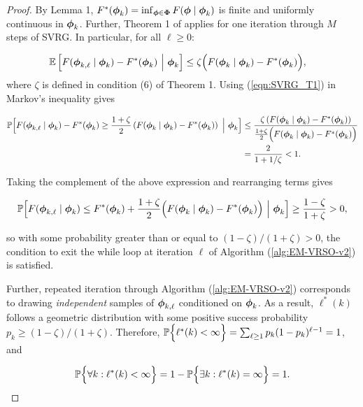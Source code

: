 \begin{proof}

By Lemma 1, $F^*(\boldsymbol{\phi}_k) = \inf_{\boldsymbol{\phi} \in \boldsymbol{\Phi}} F(\boldsymbol{\phi} \mid \boldsymbol{\phi}_k)$ is finite and uniformly continuous in $\boldsymbol{\phi}_k$. Further, Theorem 1 of \citet{Johnson:2013} applies for one iteration through $M$ steps of SVRG. In particular, for all $\ell \geq 0$:

\begin{align}
    \mathbb{E} & \left[F(\boldsymbol{\phi}_{k,\ell} \mid \boldsymbol{\phi}_{k}) - F^*(\boldsymbol{\phi}_k) ~\Big\vert~ \boldsymbol{\phi}_{k} \right] \leq \zeta \Big(F(\boldsymbol{\phi}_{k} \mid \boldsymbol{\phi}_{k}) - F^*(\boldsymbol{\phi}_k) \Big), \label{eqn:SVRG_T1}
\end{align}
%
where $\zeta$ is defined in condition (6) of Theorem 1. Using (\ref{eqn:SVRG_T1}) in Markov's inequality gives

\begin{align}
    \mathbb{P} \Big[F(\boldsymbol{\phi}_{k,\ell} \mid \boldsymbol{\phi}_{k}) - F^*(\boldsymbol{\phi}_{k}) \geq \frac{1 + \zeta}{2} \left(F(\boldsymbol{\phi}_{k} \mid \boldsymbol{\phi}_{k}) - F^*(\boldsymbol{\phi}_k) \right) ~\Big\vert~ \boldsymbol{\phi}_{k} \Big] &\leq \frac{\zeta \left( F(\boldsymbol{\phi}_{k} \mid \boldsymbol{\phi}_{k}) - F^*(\boldsymbol{\phi}_k) \right)}{\frac{1+\zeta}{2} \Big( F(\boldsymbol{\phi}_{k} \mid \boldsymbol{\phi}_{k}) - F^*(\boldsymbol{\phi}_k) \Big)} \\
    &= \frac{2}{1 + 1/\zeta} < 1.
\end{align}

Taking the complement of the above expression and rearranging terms gives

\begin{equation}
    \mathbb{P} \Big[F(\boldsymbol{\phi}_{k,\ell} \mid \boldsymbol{\phi}_{k}) \leq F^*(\boldsymbol{\phi}_{k}) + \frac{1 + \zeta}{2} \Big(F(\boldsymbol{\phi}_{k} \mid \boldsymbol{\phi}_{k}) - F^*(\boldsymbol{\phi}_{k}) \Big) ~\Big\vert~ \boldsymbol{\phi}_{k} \Big] \geq \frac{1-\zeta}{1 + \zeta} > 0 \label{eqn:markov_ineq},
\end{equation}

so with some probability greater than or equal to $(1-\zeta)/(1+\zeta) > 0$, the condition to exit the while loop at iteration $\ell$ of Algorithm (\ref{alg:EM-VRSO-v2}) is satisfied.

Further, repeated iteration through Algorithm (\ref{alg:EM-VRSO-v2}) corresponds to drawing \textit{independent} samples of $\boldsymbol{\phi}_{k,\ell}$ conditioned on $\boldsymbol{\phi}_k$. As a result, $\ell^*(k)$ follows a geometric distribution with some positive success probability $p_k \geq (1-\zeta)/(1+\zeta)$. Therefore, $\mathbb{P}\Big\{\ell^*(k) < \infty \Big\} = \sum_{\ell \geq 1} p_k(1-p_k)^{\ell-1} = 1$, and 

\begin{equation*}
    \mathbb{P}\Big\{\forall k : \ell^*(k) < \infty \Big\} = 1 - \mathbb{P}\Big\{\exists k : \ell^*(k) = \infty \Big\} = 1.
\end{equation*}
\end{proof}


